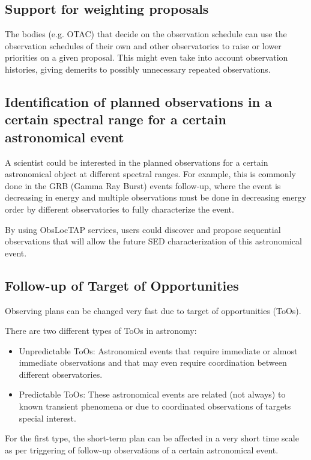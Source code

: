 \documentclass[11pt,a4paper]{ivoa}
\begin{document}
\subsection{Support for weighting proposals}
The bodies (e.g. OTAC) that decide on the observation schedule can use the observation schedules of their own and other observatories to raise or lower priorities on a given proposal. This might even take into   account observation histories, giving demerits to possibly unnecessary   repeated observations.

\subsection{Identification of planned observations in a certain spectral range for a certain astronomical event}
A scientist could be interested in the planned observations for a certain astronomical object at different spectral ranges. For example, this is commonly done in the GRB (Gamma Ray Burst) events follow-up, where the event is decreasing in energy and multiple observations must be done in decreasing energy order by different observatories to fully characterize the event.

By using ObsLocTAP services, users could discover and propose sequential observations that will allow the future SED characterization of this astronomical event.

\subsection{Follow-up of Target of Opportunities}
Observing plans can be changed very fast due to target of opportunities (ToOs).

There are two different types of ToOs in astronomy:
\begin{itemize}
	\item Unpredictable ToOs: Astronomical events that require immediate or almost immediate observations and that may even require coordination between different observatories.

	\item Predictable ToOs: These astronomical events are related (not always) to known transient phenomena or due to coordinated observations of targets special interest. 
\end{itemize}

For the first type, the short-term plan can be affected in a very short time scale as per triggering of follow-up observations of a certain astronomical event.
\end{document}
